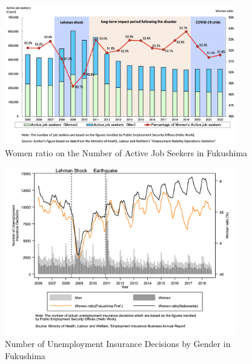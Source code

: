 \documentclass[a4paper,12pt]{article}
\begin{document}

\begin{figure}[h!]
    \centering
    \includegraphics[width=0.9\textwidth]{Women ratio on the number of active job seekers2.jpeg}  %
    \caption{Women ratio on the Number of Active Job Seekers in Fukushima}
    \label{fig:women_ratio_fukushima}
\end{figure}



\begin{figure}[h!]
    \centering
    \includegraphics[width=0.9\textwidth]{Number of Unemployment Insurance decisions.jpg}  %
    \caption{Number of Unemployment Insurance Decisions by Gender in Fukushima}
    \label{fig:employment_insurance_decisions}
\end{figure}
\end{document}
